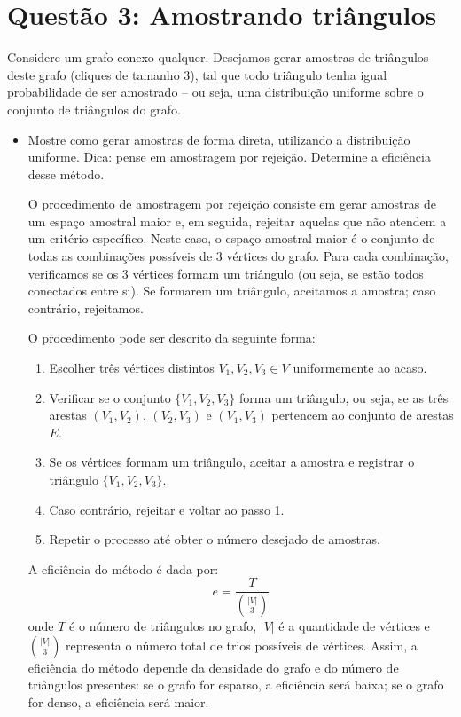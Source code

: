 \section*{Questão 3: Amostrando triângulos}

Considere um grafo conexo qualquer. Desejamos gerar amostras de triângulos deste grafo (cliques de tamanho 3), tal que todo triângulo tenha igual probabilidade de ser amostrado -- ou seja, uma distribuição uniforme sobre o conjunto de triângulos do grafo.

\begin{itemize}
  \item Mostre como gerar amostras de forma direta, utilizando a distribuição uniforme. Dica: pense em amostragem por rejeição. Determine a eficiência desse método.
\begin{resposta}
  O procedimento de amostragem por rejeição consiste em gerar amostras de um espaço amostral maior e, em seguida, rejeitar aquelas que não atendem a um critério específico. Neste caso, o espaço amostral maior é o conjunto de todas as combinações possíveis de 3 vértices do grafo. Para cada combinação, verificamos se os 3 vértices formam um triângulo (ou seja, se estão todos conectados entre si). Se formarem um triângulo, aceitamos a amostra; caso contrário, rejeitamos.

  O procedimento pode ser descrito da seguinte forma:
  \begin{enumerate}
    \item Escolher três vértices distintos $V_1, V_2, V_3 \in V$ uniformemente ao acaso.
    
    \item Verificar se o conjunto $\{V_1, V_2, V_3\}$ forma um triângulo, ou seja, se as três arestas $(V_1, V_2)$, $(V_2, V_3)$ e $(V_1, V_3)$ pertencem ao conjunto de arestas $E$.

    \item Se os vértices formam um triângulo, aceitar a amostra e registrar o triângulo $\{V_1, V_2, V_3\}$.

    \item Caso contrário, rejeitar e voltar ao passo 1.

    \item Repetir o processo até obter o número desejado de amostras.
  \end{enumerate}

  A eficiência do método é dada por:
  $$
  e = \frac{T}{\binom{|V|}{3}}
  $$
  onde $T$ é o número de triângulos no grafo, $|V|$ é a quantidade de vértices e $\binom{|V|}{3}$ representa o número total de trios possíveis de vértices. Assim, a eficiência do método depende da densidade do grafo e do número de triângulos presentes: se o grafo for esparso, a eficiência será baixa; se o grafo for denso, a eficiência será maior.
\end{resposta}


\end{itemize}
